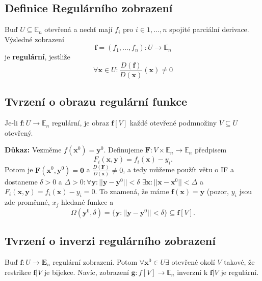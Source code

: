 \documentclass[../main.tex]{subfiles}
\begin{document}
\subsection{Definice Regulárního zobrazení}
\hspace{1.2mm}
\noindent
Buď $U \subseteq \mathbb{E}_n$ otevřená a nechť mají $f_i$ pro $i \in {1, ... , n}$
spojité parciální derivace. Výsledné zobrazení
\[ \mathbf{f} = (f_1, ... , f_n): U \to \mathbb{E}_n \]
je \textbf{regulární}, jestliže
\[ \forall \mathbf{x} \in U: \frac{D(\mathbf{f})}{D(\mathbf{x})}(\mathbf{x}) \neq 0 \]


\subsection{Tvrzení o obrazu regulární funkce}
\hspace{1.2mm}
\noindent
Je-li $\mathbf{f}: U \to \mathbb{E}_n$ regulární, je obraz $\mathbf{f}[V]$ každé otevřené podmnožiny
$V \subseteq U$ otevřený.

\vspace{5mm}
\noindent
\textbf{Důkaz:} Vezměme $f(\textbf{x}^0) = \textbf{y}^0.$ Definujeme $\textbf{F} : V \times \mathbb{E}_n \rightarrow \mathbb{E}_n$ předpisem
\[F_i(\textbf{x},\textbf{y}) = f_i(\textbf{x}) - y_i.\]
Potom je $\textbf{F}(\textbf{x}^0,\textbf{y}^0) = \textbf{0}$
a $\frac{D(\textbf{F})}{D(\textbf{x})} \neq 0$, 
a tedy můžeme použít větu o IF a dostaneme 
$\delta > 0$ a $\Delta > 0 : \forall \textbf{y} : ||\textbf{y} - \textbf{y}^0|| < \delta$ $\exists \textbf{x} : ||\textbf{x} - \textbf{x}^0|| < \Delta$ a 
$F_i(\textbf{x},\textbf{y}) = f_i(\textbf{x}) - y_i = 0$. To znamená, že máme $\textbf{f}(\textbf{x}) = \textbf{y}$ (pozor, $y_i$ jsou zde proměnné, $x_j$ hledané funkce a
\[\Omega(\textbf{y}^0,\delta) = \{\textbf{y} : ||\textbf{y} - \textbf{y}^0 || < \delta \} \subseteq \textbf{f}[V].\]

\subsection{Tvrzení o inverzi regulárního zobrazení}
\hspace{1.2mm}
\noindent
Buď $\mathbf{f}: U \to \mathbf{E}_n$ regulární zobrazení. Potom $\forall \mathbf{x}^0 \in U \exists$
otevřené okolí $V$ takové, že restrikce $\mathbf{f}|V$ je bijekce. Navíc, zobrazení
$\mathbf{g}: f[V] \to \mathbb{E}_n$ inverzní k $\mathbf{f}|V$ je regulární.
\end{document}
